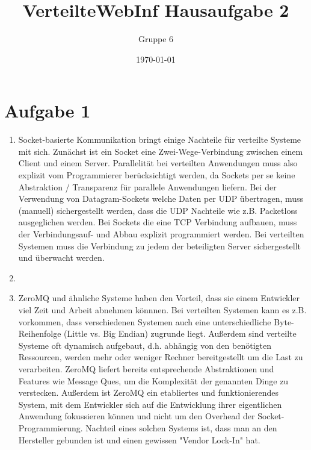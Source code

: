 \documentclass[a4paper]{article}
\author{Gruppe 6}
\title{\textbf{VerteilteWebInf Hausaufgabe 2}}
\date{\today}
\begin{document}
\maketitle

\section*{Aufgabe 1}
\begin{enumerate}[label=\alph*)]
\item Socket-basierte Kommunikation bringt einige Nachteile für verteilte Systeme mit sich. Zunächst ist ein Socket eine Zwei-Wege-Verbindung zwischen einem Client und einem Server. Parallelität bei verteilten Anwendungen muss also explizit vom Programmierer berücksichtigt werden, da Sockets per se keine Abstraktion / Transparenz für parallele Anwendungen liefern.  
Bei der Verwendung von Datagram-Sockets welche Daten per UDP übertragen, muss (manuell) sichergestellt werden, dass die UDP Nachteile wie z.B. Packetloss ausgeglichen werden. Bei Sockets die eine TCP Verbindung aufbauen, muss der Verbindungsauf- und Abbau explizit programmiert werden. Bei verteilten Systemen muss die Verbindung zu jedem der beteiligten Server sichergestellt und überwacht werden. 

\item

\item ZeroMQ und ähnliche Systeme haben den Vorteil, dass sie einem Entwickler viel Zeit und Arbeit abnehmen könnnen. Bei verteilten Systemen kann es z.B. vorkommen, dass verschiedenen Systemen auch eine unterschiedliche Byte-Reihenfolge (Little vs. Big Endian) zugrunde liegt. Außerdem sind verteilte Systeme oft dynamisch aufgebaut, d.h. abhängig von den benötigten Ressourcen, werden mehr oder weniger Rechner bereitgestellt um die Last zu verarbeiten. ZeroMQ liefert bereits entsprechende Abstraktionen und Features wie Message Ques, um die Komplexität der genannten Dinge zu verstecken. Außerdem ist ZeroMQ ein etabliertes und funktionierendes System, mit dem Entwickler sich auf die Entwicklung ihrer eigentlichen Anwendung fokussieren können und nicht um den Overhead der Socket-Programmierung. Nachteil eines solchen Systems ist, dass man an den Hersteller gebunden ist und einen gewissen "Vendor Lock-In" hat.  


\end{enumerate}
\end{document}
